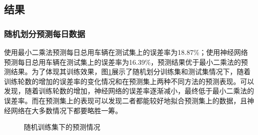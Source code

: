 \documentclass[CJK]{ctexart}
\begin{document}
\subsection{结果}
\subsubsection{随机划分预测每日数据}
使用最小二乘法预测每日总用车辆在测试集上的误差率为18.87\%；使用神经网络预测每日总用车辆在测试集上的误差率为16.39\%，预测结果优于最小二乘法的预测结果。为了体现其训练效果，图\ref{fig:loss_1}展示了随机划分训练集和测试集情况下，随着训练轮数的增加的误差率的变化情况和在预测集上两种不同方法的预测表现。可以发现，随着训练轮数的增加，神经网络的误差率逐渐减小，最终低于最小二乘法的误差率。而在预测集上的表现可以发现二者都能较好地拟合预测集上的数据，且神经网络在大多数情况下都要略胜一筹。

\begin{figure}[htbp]
    \centering
    \centering
    \caption{随机训练集下的预测情况}
    \label{fig:loss_1}
\end{figure}
\end{document}
